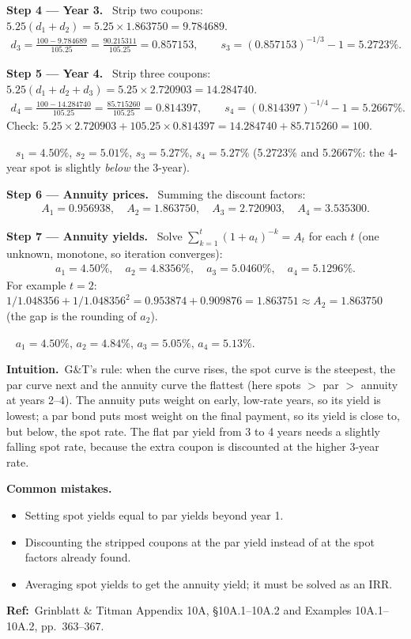 \documentclass[11pt,a4paper]{article}
\newcommand{\step}[2]{\par\medskip\noindent\textbf{Step #1 --- #2.}~}
\newcommand{\intuition}{\par\medskip\noindent\textbf{Intuition.}~}
\newcommand{\refbib}{\par\smallskip\noindent\textbf{Ref:}~}
\newcommand{\answer}[1]{\par\smallskip\noindent\fbox{\textbf{Answer #1.}}~}
\newcommand{\pitfalls}{\par\medskip\noindent\textbf{Common mistakes.}}
\begin{document}
\step{4}{Year 3} Strip two coupons: $5.25(d_1+d_2)=5.25\times1.863750=9.784689$.
\begin{align}
  d_3 = \frac{100-9.784689}{105.25} = \frac{90.215311}{105.25} = 0.857153,\qquad s_3 = (0.857153)^{-1/3}-1 = 5.2723\%. \label{r2be13-3}
\end{align}

\step{5}{Year 4} Strip three coupons: $5.25(d_1+d_2+d_3)=5.25\times2.720903=14.284740$.
\begin{align}
  d_4 = \frac{100-14.284740}{105.25} = \frac{85.715260}{105.25} = 0.814397,\qquad s_4 = (0.814397)^{-1/4}-1 = 5.2667\%. \label{r2be13-4}
\end{align}
Check: $5.25\times2.720903+105.25\times0.814397 = 14.284740+85.715260=100$.
\answer{(spot)} $s_1=4.50\%$, $s_2=5.01\%$, $s_3=5.27\%$, $s_4=5.27\%$ (5.2723\% and 5.2667\%: the 4-year spot is slightly \emph{below} the 3-year).

\step{6}{Annuity prices} Summing the discount factors:
\begin{align}
  A_1=0.956938,\quad A_2=1.863750,\quad A_3=2.720903,\quad A_4=3.535300. \label{r2be13-A}
\end{align}

\step{7}{Annuity yields} Solve $\sum_{k=1}^{t}(1+a_t)^{-k}=A_t$ for each $t$ (one unknown, monotone, so iteration converges):
\begin{align}
  a_1 = 4.50\%,\quad a_2 = 4.8356\%,\quad a_3 = 5.0460\%,\quad a_4 = 5.1296\%. \label{r2be13-a}
\end{align}
For example $t=2$: $1/1.048356+1/1.048356^2 = 0.953874+0.909876 = 1.863751\approx A_2=1.863750$ (the gap is the rounding of $a_2$).
\answer{(annuity)} $a_1=4.50\%$, $a_2=4.84\%$, $a_3=5.05\%$, $a_4=5.13\%$.

\intuition G\&T's rule: when the curve rises, the spot curve is the steepest, the par curve next and the annuity curve the flattest
(here spots $>$ par $>$ annuity at years 2--4). The annuity puts weight on early, low-rate years, so its yield is lowest; a par bond
puts most weight on the final payment, so its yield is close to, but below, the spot rate. The flat par yield from 3 to 4 years needs a
slightly falling spot rate, because the extra coupon is discounted at the higher 3-year rate.
\pitfalls
\begin{itemize}
  \item Setting spot yields equal to par yields beyond year 1.
  \item Discounting the stripped coupons at the par yield instead of at the spot factors already found.
  \item Averaging spot yields to get the annuity yield; it must be solved as an IRR.
\end{itemize}
\refbib{Grinblatt \& Titman Appendix 10A, \S10A.1--10A.2 and Examples 10A.1--10A.2, pp.~363--367.}
\end{document}
